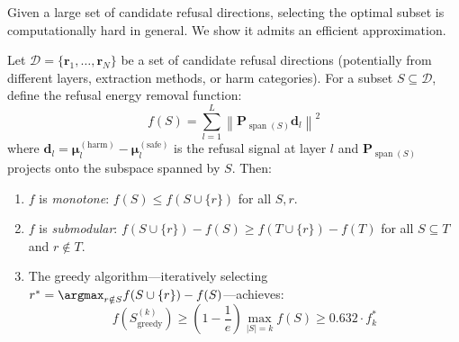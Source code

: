 Given a large set of candidate refusal directions, selecting the optimal subset is computationally hard in general.
We show it admits an efficient approximation.

\begin{theorem}
\label{thm:submodular}
Let $\mathcal{D} = \{\mathbf{r}_1, \ldots, \mathbf{r}_N\}$ be a set of candidate refusal directions (potentially from different layers, extraction methods, or harm categories).
For a subset $S \subseteq \mathcal{D}$, define the refusal energy removal function:
\begin{equation}
    f(S) = \sum_{l=1}^L \left\|\mathbf{P}_{\operatorname{span}(S)} \mathbf{d}_l\right\|^2
\end{equation}
where $\mathbf{d}_l = \boldsymbol{\mu}_l^{(\text{harm})} - \boldsymbol{\mu}_l^{(\text{safe})}$ is the refusal signal at layer $l$ and $\mathbf{P}_{\operatorname{span}(S)}$ projects onto the subspace spanned by $S$.
Then:

\begin{enumerate}[label=(\roman*)]
    \item $f$ is \emph{monotone}: $f(S) \leq f(S \cup \{r\})$ for all $S, r$.
    \item $f$ is \emph{submodular}: $f(S \cup \{r\}) - f(S) \geq f(T \cup \{r\}) - f(T)$ for all $S \subseteq T$ and $r \notin T$.
    \item The greedy algorithm---iteratively selecting $r^* = \argmax_{r \notin S} f(S \cup \{r\}) - f(S)$---achieves:
    \begin{equation}
        f(S_{\text{greedy}}^{(k)}) \geq \left(1 - \frac{1}{e}\right) \max_{|S| = k} f(S) \geq 0.632 \cdot f^*_k
    \end{equation}
\end{enumerate}
\end{theorem}

